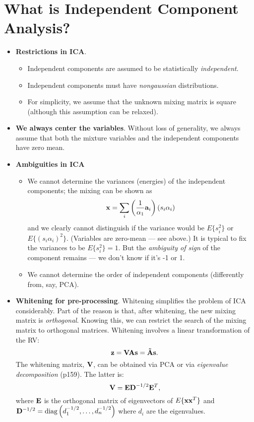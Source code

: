 \documentclass[a4paper, one	side]{book}
\begin{document}




\chapter{What is Independent Component Analysis?}

\begin{itemize}
\item \textbf{Restrictions in ICA}.
	\begin{itemize}
	\item Independent components are assumed to be statistically \textit{independent}.
	\item Independent components must have \textit{nongaussian} distributions.
	\item For simplicity, we assume that the unknown mixing matrix is square (although this assumption can be relaxed).
	\end{itemize}
	\item \textbf{We always center the variables}. Without loss of generality, we always assume that both the mixture variables and the independent components have zero mean.
\item \textbf{Ambiguities in ICA}
	\begin{itemize}
	\item We cannot determine the variances (energies) of the independent components; the mixing can be shown as $$\mathbf{x} = \sum\limits_i \left( \frac{1}{\alpha_1}\mathbf{a}_i \right)(s_i\alpha_i)$$
	and we clearly cannot distinguish if the variance would be $E\{s_i^2\}$ or $E\{(s_i\alpha_i)^2\}$. (Variables are zero-mean \---- see above.) It is typical to fix the variances to be $E\{s_i^2\}=1$. But the \textit{ambiguity of sign} of the component remains \---- we don't know if it's -1 or 1.
	\item We cannot determine the order of independent components (differently from, say, PCA).
	\end{itemize}
\item \textbf{Whitening for pre-processing}. Whitening simplifies the problem of ICA considerably. Part of the reason is that, after whitening, the new mixing matrix is \textit{orthogonal}. Knowing this, we can restrict the search of the mixing matrix to orthogonal matrices. Whitening involves a linear transformation of the RV:%
$$\mathbf{z=VAs=\tilde{A}s}.$$
The whitening matrix, $\mathbf V$, can be obtained via PCA or via \textit{eigenvalue decomposition} (p159). The latter is: $$\mathbf{V=ED}^{-1/2}\mathbf{E}^T,$$ 
where $\mathbf E$ is the orthogonal matrix of eigenvectors of $E\{\mathbf{xx}^T\}$ and $\mathbf D^{-1/2} = \text{diag}\left(d_1^{-1/2},\hdots,d_n^{-1/2}\right)$ where $d_i$ are the eigenvalues.


\end{itemize}
\end{document}
